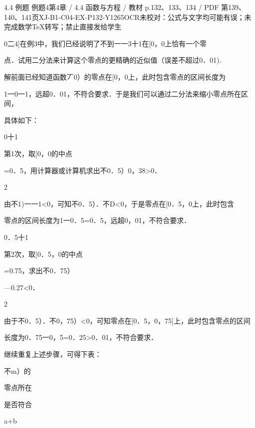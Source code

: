 \begin{bankitem}{4.4 例题 例题4}{第4章 / 4.4 函数与方程 / 教材 p.132、133、134 / PDF 第139、140、141页}{XJ-B1-C04-EX-P132-Y1265}{OCR未校对：公式与文字均可能有误；未完成数学TeX转写；禁止直接发给学生}
\begin{ocrdraft}
\par
0二4]在例3中，我们已经说明了不到一一3十1在[0，0上恰有一个零
\par
点．试用二分法来计算这个零点的更精确的近似值（误差不超过0．01).
\par
解前面已经知道函数丆0）的零点在[0，0上，此时包含零点的区间长度为
\par
1一0一1，远超0．01，不符合要求．于是我们可以通过二分法来缩小零点所在区间，
\par
具体如下：
\par
0十1
\par
第1次，取[0，0的中点
\par
=0．5，用计算器或计算机求出不0．5）0，38>0．
\par
2
\par
由不1)一一1<0，可知不0．5）．不D<0，于是零点在[0．5，0上，此时包含
\par
零点的区间长度为1一0．5=0．5，远超0，01，不符合要求．
\par
[教材p.133 / PDF第140页]
\par
0．5十1
\par
第2次，取[0．5，0的中点
\par
=0.75，求出不0．75）
\par
—0.27<0．
\par
2
\par
由于不0．5）．不0，75）<0，可知零点在[0．5，0，75]上，此时包含零点的区间
\par
长度为0．75一0，5=0．25>0．01，不符合要求．
\par
继续重复上述步骤，可得下表：
\par
不m）的
\par
零点所在
\par
是否符合
\par
a+b
\par

\end{ocrdraft}
\end{bankitem}
